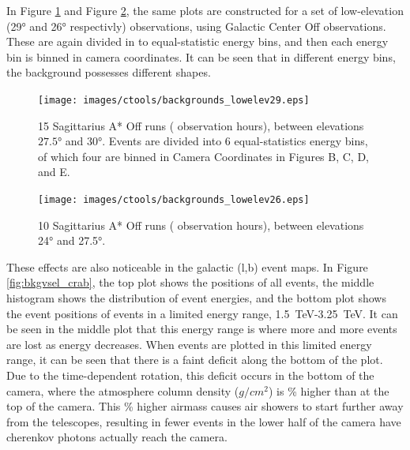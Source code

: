     In Figure \ref{fig:back_lowelev29} and Figure \ref{fig:back_lowelev26}, the same plots are constructed for a set of low-elevation (\nicetilde{}\ang{29} and \nicetilde{}\ang{26} respectivly) observations, using Galactic Center Off observations.
    These are again divided in to equal-statistic energy bins, and then each energy bin is binned in camera coordinates.
    It can be seen that in different energy bins, the background possesses different shapes.

    \begin{figure}[ht]
      \centering
      \texttt{[image: images/ctools/backgrounds\_lowelev29.eps]}
      \caption[CTOOLS Background at \ang{29} Elevation]{
        15 Sagittarius A* Off runs ( observation hours), between elevations $ \ang{27.5} $ and $ \ang{30} $.
        Events are divided into 6 equal-statistics energy bins, of which four are binned in Camera Coordinates in Figures B, C, D, and E.
      }
      \label{fig:back_lowelev29}
    \end{figure}

    \begin{figure}[ht]
      \centering
      \texttt{[image: images/ctools/backgrounds\_lowelev26.eps]}
      \caption[CTOOLS Background at \ang{26} Elevation]{
        10 Sagittarius A* Off runs ( observation hours), between elevations \ang{24} and \ang{27.5}. 
      }
      \label{fig:back_lowelev26}
    \end{figure}
  
  
  These effects are also noticeable in the galactic (l,b) event maps.
  In Figure \ref{fig:bkgvsel_crab}, the top plot shows the positions of all events, the middle histogram shows the distribution of event energies, and the bottom plot shows the event positions of events in a limited energy range, \SI{1.5}{\TeV}-\SI{3.25}{\TeV}.
  It can be seen in the middle plot that this energy range is where more and more events are lost as energy decreases.
  When events are plotted in this limited energy range, it can be seen that there is a faint deficit along the bottom of the plot.
  Due to the time-dependent rotation, this deficit occurs in the bottom of the camera, where the atmosphere column density ($g/cm^2$) is \% higher than at the top of the camera.
  This \% higher airmass causes air showers to start further away from the telescopes, resulting in fewer events in the lower half of the camera have cherenkov photons actually reach the camera.

